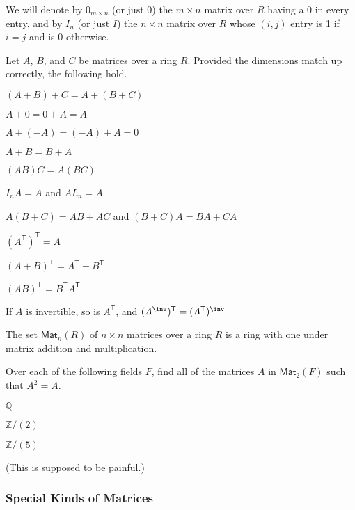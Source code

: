 We will denote by $0_{m \times n}$ (or just $0$) the $m \times n$ matrix over $R$ having a 0 in every entry, and by $I_n$ (or just $I$) the $n \times n$ matrix over $R$ whose $(i,j)$ entry is 1 if $i = j$ and is 0 otherwise.

\begin{prp} Let $A$, $B$, and $C$ be matrices over a ring $R$. Provided the dimensions match up correctly, the following hold.
\begin{enumerate*}
\item $(A+B)+C = A+(B+C)$
\item $A+0 = 0+A = A$
\item $A+(-A) = (-A)+A = 0$
\item $A+B = B+A$
\item $(AB)C = A(BC)$
\item $I_nA = A$ and $AI_m = A$
\item $A(B+C) = AB + AC$ and $(B+C)A = BA + CA$
\item $(A^\mathsf{T})^\mathsf{T} = A$
\item $(A+B)^\mathsf{T} = A^\mathsf{T} + B^\mathsf{T}$
\item $(AB)^\mathsf{T} = B^\mathsf{T} A^\mathsf{T}$
\item If $A$ is invertible, so is $A^\mathsf{T}$, and $(A^\inv)^\mathsf{T} = (A^\mathsf{T})^\inv$
\end{enumerate*}
\end{prp}

\begin{cor}
The set $\mathsf{Mat}_n(R)$ of $n \times n$ matrices over a ring $R$ is a ring with one under matrix addition and multiplication.
\end{cor}

\NowForSomeExercises

\begin{exercises}
\item Over each of the following fields $F$, find all of the matrices $A$ in $\mathsf{Mat}_2(F)$ such that $A^2 = A$.
\begin{inparaenum}
\item $\mathbb{Q}$
\item $\mathbb{Z}/(2)$
\item $\mathbb{Z}/(5)$
\end{inparaenum}
(This is supposed to be painful.)
\PauseExercises
\end{exercises}

\subsubsection*{Special Kinds of Matrices}

